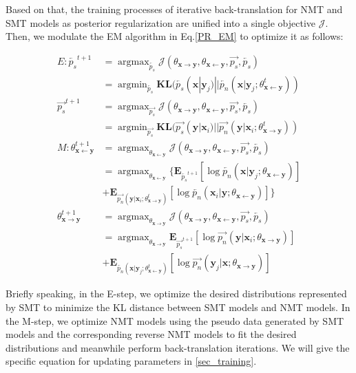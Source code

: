 \documentclass[letterpaper]{article} \usepackage{aaai19}  \usepackage{times}  \usepackage{helvet}  \usepackage{courier}  \usepackage{url}  \usepackage{graphicx}  \usepackage{amsmath}
\newcommand{\newref}[1]{Eq.\eqref{#1}}
\newcommand{\bx}{\mathbf{x}}
\newcommand{\by}{\mathbf{y}}
\newcommand{\righttheta}{\theta_{\bx\rightarrow \by}}
\newcommand{\lefttheta}{\theta_{\bx\leftarrow \by}}
\begin{document}
Based on that, the training processes of iterative back-translation for NMT and SMT models as posterior regularization are unified into a single objective $\mathcal{J}$. Then, we modulate the EM algorithm in \newref{PR_EM} to optimize it as follows: 

\begin{equation}
\begin{aligned}
E: \overleftarrow{p_s}^{t+1} 
&= \mathop{\arg\max}_{\overleftarrow{p_s}}\mathcal{J}(\righttheta,\lefttheta,\overrightarrow{p_s}, \overleftarrow{p_s}) \\
&= \mathop{\arg\min}_{\overleftarrow{p_s}}\mathbf{KL}(\overleftarrow{p_s}(\bx|\by_{j})||\overleftarrow{p_n}(\bx|\by_{j};\lefttheta^{t}))\\
\overrightarrow{p_s}^{t+1} 
&= \mathop{\arg\max}_{\overrightarrow{p_s}}\mathcal{J}(\righttheta,\lefttheta,\overrightarrow{p_s}, \overleftarrow{p_s}) \\
&= \mathop{\arg\min}_{\overrightarrow{p_s}}\mathbf{KL}(\overrightarrow{p_s}(\by|\bx_{i})||\overrightarrow{p_n}(\by|\bx_{i};\righttheta^{t}))\\
M: \lefttheta^{t+1} 
&= \mathop{\arg\max}_{\lefttheta}\mathcal{J}(\righttheta,\lefttheta,\overrightarrow{p_s}, \overleftarrow{p_s}) \\
&= \mathop{\arg\max}_{\lefttheta}\{\mathbf{E}_{\overleftarrow{p_s}^{t+1}}[\log \overleftarrow{p_n}(\bx|\by_j;\lefttheta)]\\
&+\mathbf{E}_{\overrightarrow{p_n}(\by|\bx_i;\righttheta^{t})}[\log \overleftarrow{p_n}(\bx_i|\by;\lefttheta)]\}\\
\righttheta^{t+1} 
&= \mathop{\arg\max}_{\righttheta}\mathcal{J}(\righttheta,\lefttheta,\overrightarrow{p_s}, \overleftarrow{p_s}) \\
&= \mathop{\arg\max}_{\righttheta}\mathbf{E}_{\overrightarrow{p_s}^{t+1}}[\log \overrightarrow{p_n}(\by|\bx_i;\righttheta)]\\
&+\mathbf{E}_{\overleftarrow{p_n}(\bx|\by_j;\lefttheta^{t})}[\log \overrightarrow{p_n}(\by_j|\bx;\righttheta)]
\end{aligned}
\label{EM}
\end{equation}

Briefly speaking, in the E-step, we optimize the desired distributions represented by SMT to minimize the KL distance between SMT models and NMT models. In the M-step, we optimize NMT models using the pseudo data generated by SMT models and the corresponding reverse NMT models to fit the desired distributions and meanwhile perform back-translation iterations. We will give the specific equation for updating parameters in \ref{sec_training}. 
\end{document}

